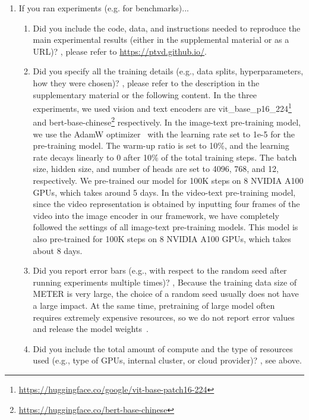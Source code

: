 \begin{enumerate}
\item If you ran experiments (e.g. for benchmarks)...
\begin{enumerate}
  \item Did you include the code, data, and instructions needed to reproduce the main experimental results (either in the supplemental material or as a URL)?
    \answerYes{}, please refer to \url{https://ptvd.github.io/}.
  \item Did you specify all the training details (e.g., data splits, hyperparameters, how they were chosen)?
    \answerYes{}, please refer to the description in the supplementary material or the following content. In the three experiments, we used vision and text encoders are vit\_base\_p16\_224\footnote{\url{https://huggingface.co/google/vit-base-patch16-224}} and bert-base-chinese\footnote{\url{https://huggingface.co/bert-base-chinese}} respectively.
    In the image-text pre-training model, we use the AdamW optimizer~\citep{adamw2017axriv} with the learning rate set to 1e-5 for the pre-training model.
    The warm-up ratio is set to 10\%, and the learning rate decays linearly to 0 after 10\% of the total training steps.
    The batch size, hidden size, and number of heads are set to 4096, 768, and 12, respectively.
    We pre-trained our model for 100K steps on 8 NVIDIA A100 GPUs, which takes around 5 days.
    In the video-text pre-training model, since the video representation is obtained by inputting four frames of the video into the image encoder in our framework, we have completely followed the settings of all image-text pre-training models. 
    This model is also pre-trained for 100K steps on 8 NVIDIA A100 GPUs, which takes about 8 days. 
	\item Did you report error bars (e.g., with respect to the random seed after running experiments multiple times)?
    \answerNo{}, Because the training data size of METER is very large, the choice of a random seed usually does not have a large impact. At the same time, pretraining of large model often requires extremely expensive resources, so we do not report error values and release the model weights~\citep{meter2022cvpr}.
	\item Did you include the total amount of compute and the type of resources used (e.g., type of GPUs, internal cluster, or cloud provider)?
    \answerYes{}, see above.
\end{enumerate}


\end{enumerate}
